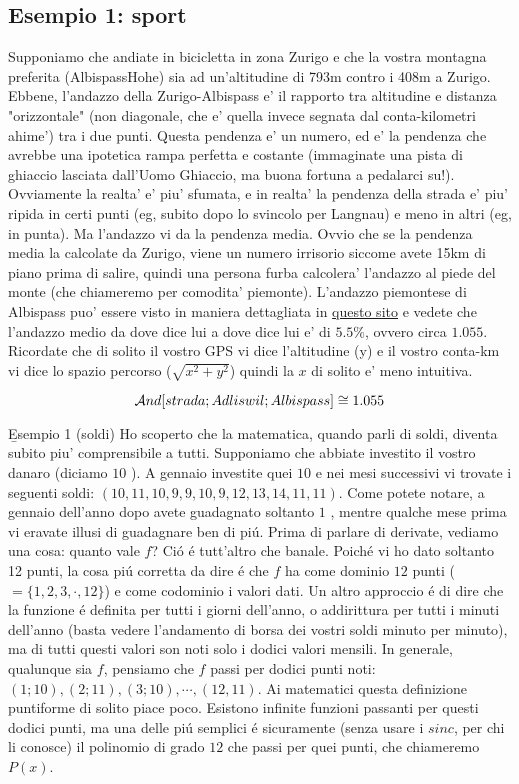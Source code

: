 \subsection{Esempio 1: sport}

Supponiamo che andiate in bicicletta in zona Zurigo e che la vostra montagna preferita (AlbispassHohe) sia ad un'altitudine di 793m 
contro i 408m a Zurigo. Ebbene, l'andazzo della Zurigo-Albispass e' il rapporto tra altitudine e distanza "orizzontale" (non diagonale, che e' quella invece
segnata dal conta-kilometri ahime') tra i due punti. Questa pendenza e' un numero, ed e' la pendenza che avrebbe una ipotetica rampa perfetta e costante
(immaginate una pista di ghiaccio lasciata dall'Uomo Ghiaccio, ma buona fortuna a pedalarci su!). Ovviamente la realta' e' piu' sfumata, e in realta' la
pendenza della strada e' piu' ripida in certi punti (eg, subito dopo lo svincolo per Langnau) e meno in altri (eg, in punta). Ma l'andazzo vi da la pendenza
media. Ovvio che se la pendenza media la calcolate da Zurigo, viene un numero irrisorio siccome avete 15km di piano prima di salire, quindi una persona furba 
calcolera' l'andazzo al piede del monte (che chiameremo per comodita' piemonte). L'andazzo piemontese di Albispass puo' essere visto in 
maniera dettagliata in  \href{https://www.climbbybike.com/climb/Albispass/5186}{questo sito} e vedete che l'andazzo medio da dove dice lui a dove dice 
lui e' di $ 5.5 \% $, ovvero circa $ 1.055 $. Ricordate che di solito il vostro GPS vi dice l'altitudine (y) e il vostro conta-km vi dice lo spazio percorso ($\sqrt{x^2+y^2}$) 
quindi la $x$ di solito e' meno intuitiva.

\begin{equation}
 \mathcal{A}nd[strada; Adliswil; Albispass] \cong 1.055 
\end{equation}

\b{Esempio 1 (soldi)} Ho scoperto che la matematica, quando parli di soldi, diventa subito piu' comprensibile a tutti. 
Supponiamo che abbiate investito il vostro danaro (diciamo $10$ \EUR).
A gennaio investite quei $10$ e nei mesi successivi vi trovate i seguenti soldi: $(10,11,10,9,9,10,9,12,13,14,11,11)$. Come potete notare,
a gennaio dell'anno dopo avete guadagnato soltanto $1$ \EUR, mentre qualche mese prima vi eravate illusi di guadagnare ben di pi\'u. Prima di
parlare di derivate, vediamo una cosa: quanto vale $f$? Ci\'o \'e tutt'altro che banale. Poich\'e vi ho dato soltanto 12 punti, la cosa pi\'u
corretta da dire \'e che $f$ ha come dominio $12$ punti ($= \{1,2,3,\cdot,12\}$) e come codominio i valori dati. Un altro approccio \'e di dire
che la funzione \'e definita per tutti i giorni dell'anno, o addirittura per tutti i minuti dell'anno (basta vedere l'andamento di borsa dei
vostri soldi minuto per minuto), ma di tutti questi valori son noti solo i dodici valori mensili. In generale, qualunque sia $f$, pensiamo
che $f$ passi per dodici punti noti: $(1;10),(2;11),(3;10),\cdots,(12,11)$. Ai matematici questa definizione puntiforme di solito piace poco.
Esistono infinite funzioni passanti per questi dodici punti, ma una delle pi\'u semplici \'e sicuramente (senza usare i $sinc$, per chi li
conosce) il polinomio di grado $12$ che passi per quei punti, che chiameremo $P(x)$.

